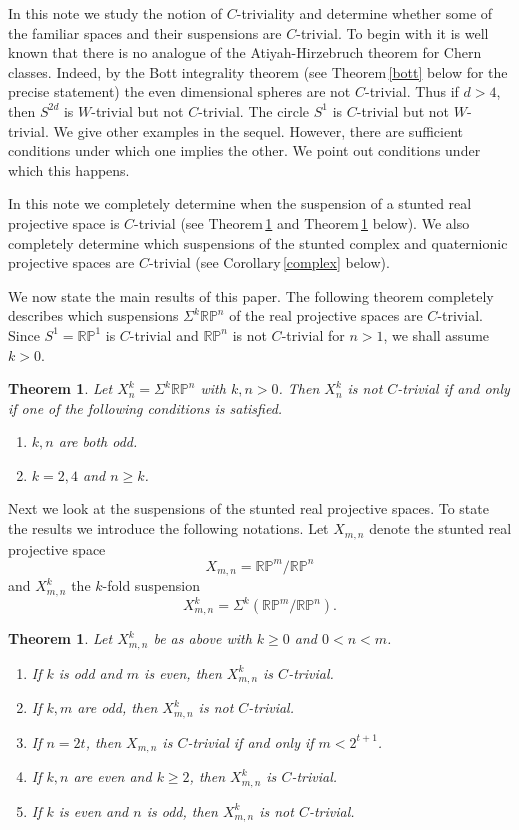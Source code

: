 \documentclass[12pt,reqno]{amsart}
\numberwithin{equation}{subsection}
\newtheorem{Thm}[subsection]{Theorem}
\theoremstyle{definition}
\begin{document}
In this note we study the notion of $C$-triviality and determine whether some of the familiar spaces and their suspensions are $C$-trivial. 
To begin with it is well known that there is no analogue of the Atiyah-Hirzebruch theorem for Chern classes. Indeed, by the Bott integrality theorem (see Theorem\,\ref{bott} below for the precise statement) the even dimensional spheres are not $C$-trivial. 
Thus if $d>4$, then $S^{2d}$ is $W$-trivial but not $C$-trivial. The circle $S^1$ is $C$-trivial but not $W$-trivial. 
We give other examples in the sequel. 
However, there are sufficient conditions under which one implies the other. We point out conditions under which this happens. 

In this note we completely determine when the suspension of a stunted real projective space is $C$-trivial (see Theorem\,\ref{secondtheorem} and Theorem\,\ref{thirdtheorem} below). We also 
completely determine which suspensions of the stunted complex and quaternionic projective spaces are $C$-trivial (see Corollary\,\ref{complex} below). 
 
We now state the main results of this paper.  
The following theorem completely describes which suspensions $\Sigma^k\mathbb R\mathbb P^n$ of the real projective spaces are $C$-trivial. Since $S^1 =  \mathbb R \mathbb P^1$ is $C$-trivial and $\mathbb R \mathbb P^n$ is not $C$-trivial for $n >1$,  we shall assume $k>0$.

\begin{Thm} \label{secondtheorem} Let $X^k_n=\Sigma^k \mathbb R\mathbb P^n$ with $k,n>0$.  Then $X^k_n$ is not $C$-trivial if and only if one of the following conditions is satisfied. 
\begin{enumerate}
\item $k,n$ are both odd. 
\item $k=2,4$ and $n\geq k$.
\end{enumerate}
\end{Thm}
 

Next we look at the suspensions of the stunted real projective spaces.  To state the results we introduce the following notations. 
Let $X_{m,n}$ denote the stunted real projective space 
$$X_{m,n}=\mathbb R\mathbb P^m/\mathbb R\mathbb P^n$$
and $X^k_{m,n}$ the $k$-fold suspension 
$$X^k_{m,n}=\Sigma^k\left(\mathbb R\mathbb P^m/\mathbb R\mathbb P^n\right).$$

\begin{Thm}\label{thirdtheorem} 
Let $X^k_{m,n}$ be as above with $k\geq 0$ and $0<n<m$. 
\begin{enumerate}
\item If $k$ is odd and $m$ is even, then $X^k_{m,n}$ is $C$-trivial. 
\item If $k,m$ are odd, then $X^k_{m,n}$ is not $C$-trivial.
\item If $ n= 2t$, then $X_{m,n}$ is $C$-trivial if and only if $m< 2^{t+1}$. 
\item If $k,n$ are even and $k\geq 2$, then $X^k_{m,n}$ is $C$-trivial. 
\item If $k$ is even and $n$ is odd, then $X^k_{m,n}$ is not $C$-trivial. 
\end{enumerate}
\end{Thm}
\end{document}
